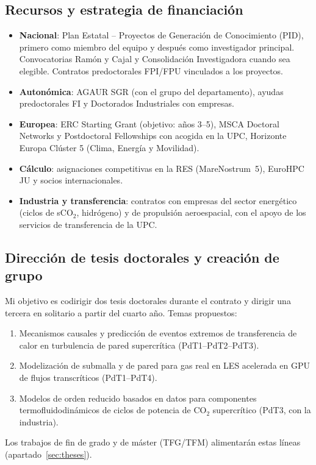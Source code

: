 \documentclass[11pt]{article}
\begin{document}
\subsection{Recursos y estrategia de financiación}\label{sec:resources}
\begin{itemize}
\item \textbf{Nacional}: Plan Estatal -- Proyectos de Generación de Conocimiento (PID),
primero como miembro del equipo y después como investigador principal. Convocatorias Ramón
y Cajal y Consolidación Investigadora cuando sea elegible. Contratos predoctorales FPI/FPU
vinculados a los proyectos.
\item \textbf{Autonómica}: AGAUR SGR (con el grupo del departamento), ayudas predoctorales
FI y Doctorados Industriales con empresas.
\item \textbf{Europea}: ERC Starting Grant (objetivo: años 3--5), MSCA Doctoral Networks y
Postdoctoral Fellowships con acogida en la UPC, Horizonte Europa Clúster 5 (Clima, Energía
y Movilidad).
\item \textbf{Cálculo}: asignaciones competitivas en la RES (MareNostrum~5), EuroHPC JU y
socios internacionales.
\item \textbf{Industria y transferencia}: contratos con empresas del sector energético
(ciclos de sCO$_2$, hidrógeno) y de propulsión aeroespacial, con el apoyo de los servicios
de transferencia de la UPC.
\end{itemize}

\subsection{Dirección de tesis doctorales y creación de grupo}
Mi objetivo es codirigir dos tesis doctorales durante el contrato y dirigir una tercera en
solitario a partir del cuarto año. Temas propuestos:
\begin{enumerate}
\item Mecanismos causales y predicción de eventos extremos de transferencia de calor en
turbulencia de pared supercrítica (PdT1--PdT2--PdT3).
\item Modelización de submalla y de pared para gas real en LES acelerada en GPU de flujos
transcríticos (PdT1--PdT4).
\item Modelos de orden reducido basados en datos para componentes termofluidodinámicos de
ciclos de potencia de CO$_2$ supercrítico (PdT3, con la industria).
\end{enumerate}
Los trabajos de fin de grado y de máster (TFG/TFM) alimentarán estas líneas
(apartado~\ref{sec:theses}).
\end{document}
